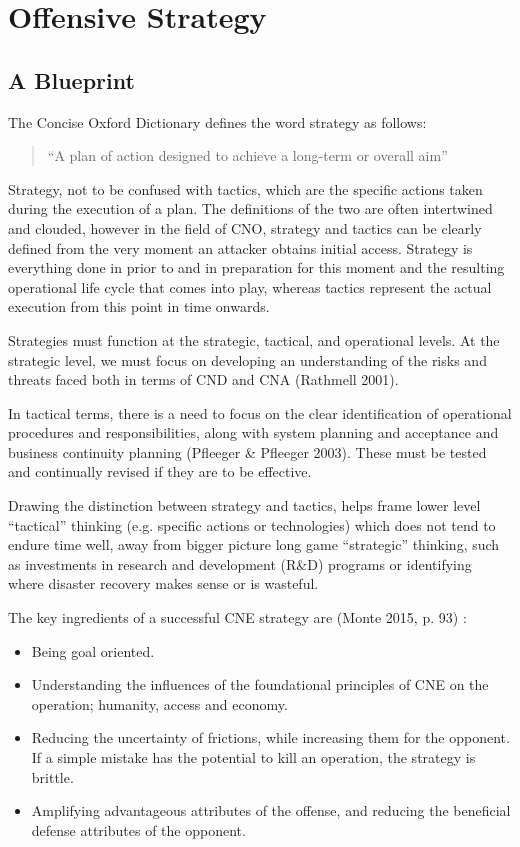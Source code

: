 \documentclass[11pt]{report}
\begin{document}
\chapter{Offensive Strategy}

\section{A Blueprint}

The Concise Oxford Dictionary defines the word strategy as follows: \begin{quote}``A plan of action designed to achieve a long-term or overall aim''\end{quote}

Strategy, not to be confused with tactics, which are the specific actions taken during the execution of a plan. The definitions of the two are often intertwined and clouded, however in the field of CNO, strategy and tactics can be clearly defined from the very moment an attacker obtains initial access. Strategy is everything done in prior to and in preparation for this moment and the resulting operational life cycle that comes into play, whereas tactics represent the actual execution from this point in time onwards.

Strategies must function at the strategic, tactical, and operational levels. At the strategic level, we must focus on developing an understanding of the risks and threats faced both in terms of CND and CNA (Rathmell 2001).

In tactical terms, there is a need to focus on the clear identification of operational procedures and responsibilities, along with system planning and acceptance and business continuity planning (Pfleeger \& Pfleeger 2003). These must be tested and continually revised if they are to be effective.

Drawing the distinction between strategy and tactics, helps frame lower level “tactical” thinking (e.g. specific actions or technologies) which does not tend to endure time well, away from bigger picture long game “strategic” thinking, such as investments in research and development (R\&D) programs or identifying where disaster recovery makes sense or is wasteful.

The key ingredients of a successful CNE strategy are (Monte 2015, p. 93) \cite{monte}:


\begin{itemize}
	\item Being goal oriented.
	\item Understanding the influences of the foundational principles of CNE on the  operation; humanity, access and economy.
	\item Reducing the uncertainty of frictions, while increasing them for the opponent. If a simple mistake has the potential to kill an operation, the strategy is brittle.
	\item Amplifying advantageous attributes of the offense, and reducing the beneficial defense  attributes of the opponent.
\end{itemize}
\end{document}
